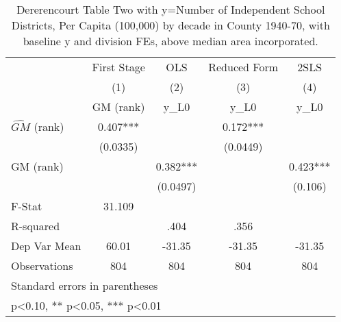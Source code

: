 \begin{table}[htbp]\centering
\def\sym#1{\ifmmode^{#1}\else\(^{#1}\)\fi}
\caption{Dererencourt Table Two with y=Number of Independent School Districts, Per Capita (100,000) by decade in County 1940-70, with baseline y and division FEs, above median area incorporated.}
\begin{tabular}{l*{4}{c}}
\toprule
                    & First Stage   &         OLS   &Reduced Form   &        2SLS   \\
                    &\multicolumn{1}{c}{(1)}&\multicolumn{1}{c}{(2)}&\multicolumn{1}{c}{(3)}&\multicolumn{1}{c}{(4)}\\
                    &\multicolumn{1}{c}{GM  (rank)}&\multicolumn{1}{c}{y\_L0}&\multicolumn{1}{c}{y\_L0}&\multicolumn{1}{c}{y\_L0}\\
\midrule
$\hat{GM}$ (rank)   &       0.407***&               &       0.172***&               \\
                    &    (0.0335)   &               &    (0.0449)   &               \\
\addlinespace
GM  (rank)          &               &       0.382***&               &       0.423***\\
                    &               &    (0.0497)   &               &     (0.106)   \\
\midrule
F-Stat              &      31.109   &               &               &               \\
R-squared           &               &        .404   &        .356   &               \\
Dep Var Mean        &       60.01   &      -31.35   &      -31.35   &      -31.35   \\
Observations        &         804   &         804   &         804   &         804   \\
\bottomrule
\multicolumn{5}{l}{\footnotesize Standard errors in parentheses}\\
\multicolumn{5}{l}{\footnotesize * p<0.10, ** p<0.05, *** p<0.01}\\
\end{tabular}
\end{table}

